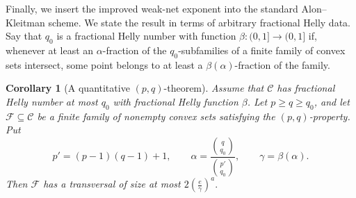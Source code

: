 \documentclass[11pt]{article}
\newtheorem{cor}[thm]{Corollary}
\theoremstyle{definition}
\newcommand{\F}{\mathcal{F}}
\newcommand{\C}{\mathcal{C}}
\begin{document}
Finally, we insert the improved weak-net exponent into the standard
Alon--Kleitman scheme.  We state the result in terms of arbitrary
fractional Helly data.  Say that $q_0$ is a fractional Helly number
with function $\beta:(0,1]\to(0,1]$ if, whenever at least an
$\alpha$-fraction of the $q_0$-subfamilies of a finite family of
convex sets intersect, some point belongs to at least a
$\beta(\alpha)$-fraction of the family.

\begin{cor}[A quantitative $(p,q)$-theorem]
\label{cor:separable-pq}
Assume that $\C$ has fractional Helly number at most $q_0$ with
fractional Helly function $\beta$.  Let $p\ge q\ge q_0$, and let
$\F\subseteq\C$ be a finite family of nonempty convex sets satisfying
the $(p,q)$-property.  Put
\[
p'=(p-1)(q-1)+1,
\qquad
\alpha=\frac{\binom q{q_0}}{\binom{p'}{q_0}},
\qquad
\gamma=\beta(\alpha).
\]
Then $\F$ has a transversal of size at most
$2\left(\frac e\gamma\right)^a.$
\end{cor}
\end{document}
